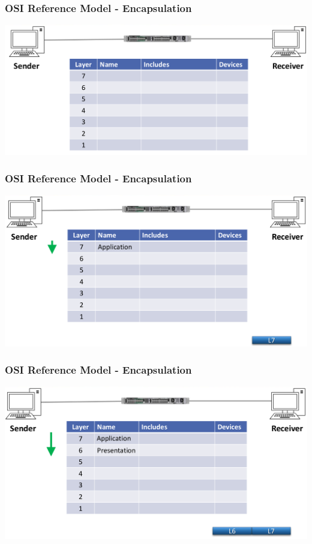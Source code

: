 \documentclass[pdflatex,compress]{beamer}
\begin{document}
\begin{frame}
	\frametitle{OSI Reference Model - Encapsulation}
	\begin{center}
		\includegraphics[width=\linewidth]{img/img04}
	\end{center}
\end{frame}

\begin{frame}
	\frametitle{OSI Reference Model - Encapsulation}
	\begin{center}
		\includegraphics[width=\linewidth]{img/img05}
	\end{center}
\end{frame}

\begin{frame}
	\frametitle{OSI Reference Model - Encapsulation}
	\begin{center}
		\includegraphics[width=\linewidth]{img/img06}
	\end{center}
\end{frame}
\end{document}
